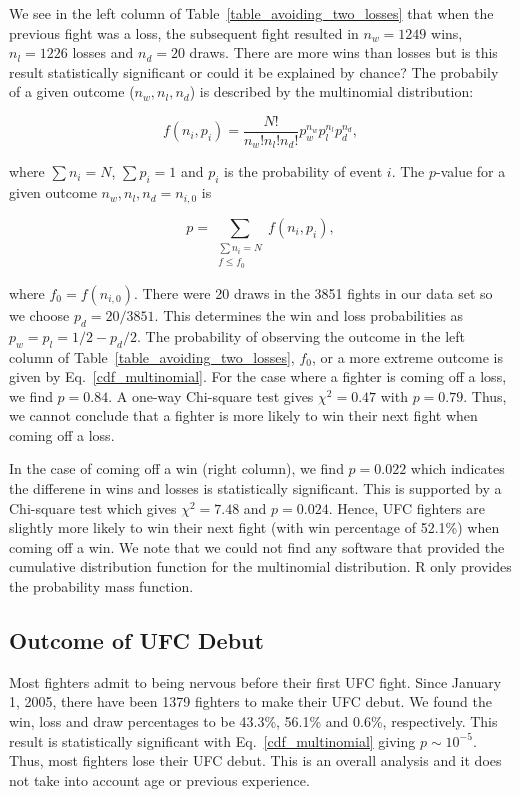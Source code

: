 We see in the left column of Table~\ref{table_avoiding_two_losses} that
when the previous fight was a loss, the subsequent fight resulted
in $n_w=1249$ wins, $n_l=1226$ losses and $n_d=20$ draws. There are more wins than losses but
is this result statistically significant or could it be explained
by chance? The probabily of a given outcome ($n_w, n_l, n_d$) is described by
the multinomial distribution:

\begin{equation}
f(n_i, p_i) = \frac{N!}{n_w! n_l! n_d!}p_w^{n_w}p_l^{n_l}p_d^{n_d},
\end{equation}

\noindent
where $\sum n_i = N$, $\sum p_i=1$ and $p_i$ is the probability
of event $i$. The $p$-value for a given
outcome $n_w, n_l, n_d=n_{i,0}$ is

\begin{equation}
p = \sum_{\substack{{\sum n_i = N} \\ {f \le f_0}}}f(n_i, p_i),
\label{cdf_multinomial}
\end{equation}

\noindent
where $f_0=f(n_{i,0})$.
There were 20 draws in the 3851 fights in our data set so we
choose $p_d=20/3851$. This determines the win and loss probabilities as
$p_w=p_l=1/2 - p_d/2$.
The probability of observing the outcome in the left
column of Table~\ref{table_avoiding_two_losses}, $f_0$, or a more extreme outcome
is given by Eq.~\ref{cdf_multinomial}. For the case where a fighter
is coming off a loss, we find $p=0.84$. A one-way Chi-square test gives $\chi^2=0.47$ with $p=0.79$.
Thus, we cannot conclude that a fighter is more likely to win their next fight
when coming off a loss.

In the case
of coming off a win (right column), we find $p=0.022$ which
indicates the differene in wins and losses is statistically significant. This is supported by a Chi-square test which
gives $\chi^2=7.48$ and $p=0.024$. Hence, 
UFC fighters are slightly more likely to win their next
fight (with win percentage of 52.1\%) when coming off a win.
We note that we could not find any software that provided the cumulative
distribution function for the multinomial distribution. R only provides
the probability mass function.

\subsection*{Outcome of UFC Debut}

Most fighters admit to being nervous before their first UFC fight.
Since January 1, 2005, there have been 1379 fighters to make their UFC debut. We found the
win, loss and draw percentages to be 43.3\%, 56.1\% and 0.6\%, respectively.
This result is statistically significant with Eq.~\ref{cdf_multinomial}
giving $p \sim 10^{-5}$. Thus, most
fighters lose their UFC debut. This is an overall analysis and it does not
take into account age or previous experience.



